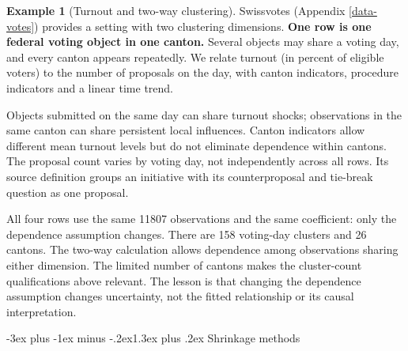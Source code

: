 \documentclass[
  11pt,
]{book}
\makeatletter
\renewcommand\section{\@startsection{section}{1}{\z@}
  {-3ex plus -1ex minus -.2ex}{1.3ex plus .2ex}
  {\normalfont\Large\bfseries\color{TextbookInk}}}
\theoremstyle{definition}
\theoremstyle{definition}
\newtheorem{example}{Example}[chapter]
\theoremstyle{definition}
\theoremstyle{definition}
\theoremstyle{remark}
\makeatother
\begin{document}
\begin{example}[Turnout and two-way clustering]
\protect\hypertarget{exm:votes-cluster-example}{}\label{exm:votes-cluster-example}Swissvotes (Appendix \ref{data-votes}) provides a setting with two clustering dimensions. \textbf{One row is one federal voting object in one canton.} Several objects may share a voting day, and every canton appears repeatedly. We relate turnout (in percent of eligible voters) to the number of proposals on the day, with canton indicators, procedure indicators and a linear time trend.

Objects submitted on the same day can share turnout shocks; observations in the same canton can share persistent local influences. Canton indicators allow different mean turnout levels but do not eliminate dependence within cantons. The proposal count varies by voting day, not independently across all rows. Its source definition groups an initiative with its counterproposal and tie-break question as one proposal.

\begin{table}[H]
\centering\begingroup\fontsize{10}{12}\selectfont

\endgroup{}
\end{table}

All four rows use the same 11807 observations and the same coefficient: only the dependence assumption changes. There are 158 voting-day clusters and 26 cantons. The two-way calculation allows dependence among observations sharing either dimension. The limited number of cantons makes the cluster-count qualifications above relevant. The lesson is that changing the dependence assumption changes uncertainty, not the fitted relationship or its causal interpretation.
\end{example}

\section{Shrinkage methods}\label{shrinkage}
\end{document}
